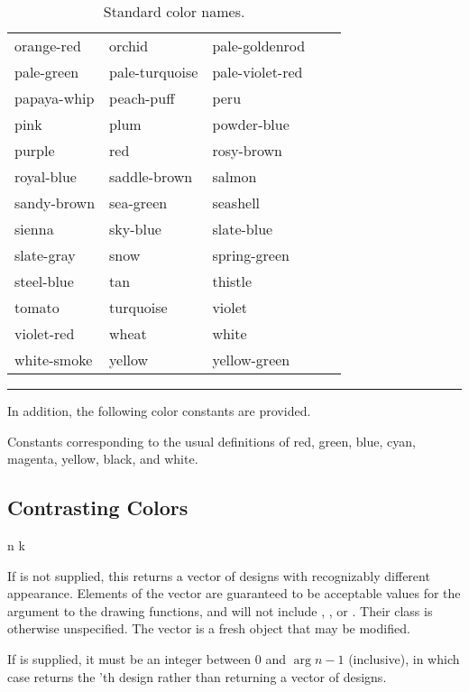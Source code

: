 \begin{table}
{\begin{tabular}{lllll}
orange-red & orchid & pale-goldenrod \\
pale-green & pale-turquoise & pale-violet-red \\
papaya-whip & peach-puff & peru \\
pink & plum & powder-blue \\
purple & red & rosy-brown \\
royal-blue & saddle-brown & salmon \\
sandy-brown & sea-green & seashell \\
sienna & sky-blue & slate-blue \\
slate-gray & snow & spring-green \\
steel-blue & tan & thistle \\
tomato & turquoise & violet \\
violet-red & wheat & white \\
white-smoke & yellow & yellow-green \\
\end{tabular}}
\caption{\label{color-names} Standard color names.}
\vspace{1pc}
\hrule
\end{table}

In addition, the following color constants are provided.


Constants corresponding to the usual definitions of red, green, blue, cyan,
magenta, yellow, black, and white.


\subsection {Contrasting Colors}

 {n \optional k}

If  is not supplied, this returns a vector of  designs with
recognizably different appearance.  Elements of the vector are guaranteed to be
acceptable values for the  argument to the drawing functions, and will
not include , , or .  Their
class is otherwise unspecified.  The vector is a fresh object that may be
modified.

If  is supplied, it must be an integer between 0 and $\arg{n}-1$
(inclusive), in which case  returns the 'th
design rather than returning a vector of designs.

